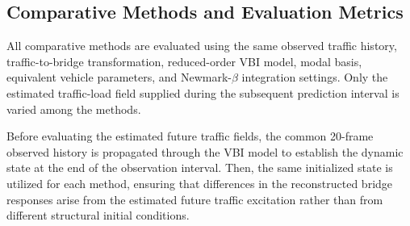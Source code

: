\documentclass[journal]{IEEEtran}
\begin{document}
\subsection{Comparative Methods and Evaluation Metrics}

All comparative methods are evaluated using the same observed traffic history, traffic-to-bridge transformation, reduced-order VBI model, modal basis, equivalent vehicle parameters, and Newmark-$\beta$ integration settings. Only the estimated traffic-load field supplied during the subsequent prediction interval is varied among the methods.

Before evaluating the estimated future traffic fields, the common 20-frame observed history is propagated through the VBI model to establish the dynamic state at the end of the observation interval. Then, the same initialized state is utilized for each method, ensuring that differences in the reconstructed bridge responses arise from the estimated future traffic excitation rather than from different structural initial conditions.
\end{document}
